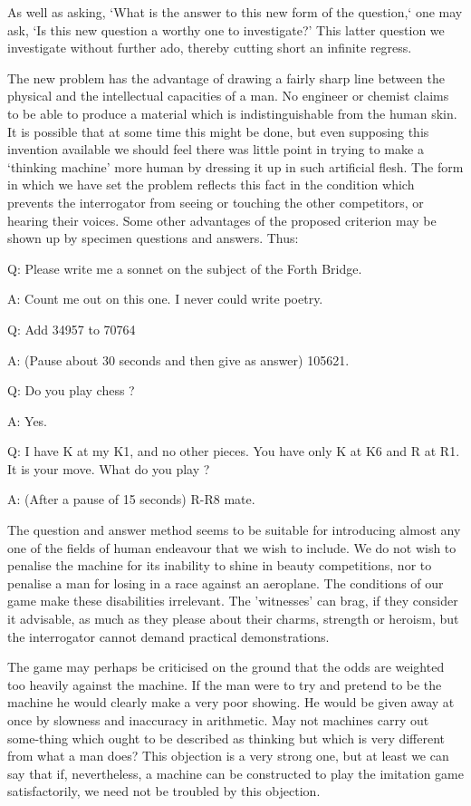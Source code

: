 \documentclass[10pt]{article} %
\newcommand{\dialogueturn}[2]{%
    \noindent\normalfont #1: #2\par %
    \vspace{0.2\baselineskip}%
}
\begin{document}
As well as asking, `What is the answer to this new form of the question,` one may ask, `Is this new question a worthy one to investigate?' This latter question we investigate without further ado, thereby cutting short an infinite regress.

The new problem has the advantage of drawing a fairly sharp line between the physical and the intellectual capacities of a man. No engineer or chemist claims to be able to produce a material which is indistinguishable from the human skin. It is possible that at some time this might be done, but even supposing this invention available we should feel there was little point in trying to make a `thinking machine' more human by dressing it up in such artificial flesh. The form in which we have set the problem reflects this fact in the condition which prevents the interrogator from seeing or touching the other competitors, or hearing their voices. Some other advantages of the proposed criterion may be shown up by specimen questions and answers. Thus:

\vspace{0.5\baselineskip} %
\dialogueturn{Q}{Please write me a sonnet on the subject of the Forth Bridge.}%
\dialogueturn{A}{Count me out on this one. I never could write poetry.}%
\dialogueturn{Q}{Add 34957 to 70764}%
\dialogueturn{A}{(Pause about 30 seconds and then give as answer) 105621.}%
\dialogueturn{Q}{Do you play chess ?}%
\dialogueturn{A}{Yes.}%
\dialogueturn{Q}{I have K at my K1, and no other pieces. You have only K at K6 and R at R1. It is your move. What do you play ?}%
\dialogueturn{A}{(After a pause of 15 seconds) R-R8 mate.}%

The question and answer method seems to be suitable for introducing almost any one of the fields of human endeavour that we wish to include. We do not wish to penalise the machine for its inability to shine in beauty competitions, nor to penalise a man for losing in a race against an aeroplane. The conditions of our game make these disabilities irrelevant. The 'witnesses' can brag, if they consider it advisable, as much as they please about their charms, strength or heroism, but the interrogator cannot demand practical demonstrations.

The game may perhaps be criticised on the ground that the odds are weighted too heavily against the machine. If the man were to try and pretend to be the machine he would clearly make a very poor showing. He would be given away at once by slowness and inaccuracy in arithmetic. May not machines carry out some-thing which ought to be described as thinking but which is very different from what a man does? This objection is a very strong one, but at least we can say that if, nevertheless, a machine can be constructed to play the imitation game satisfactorily, we need not be troubled by this objection.
\end{document}
